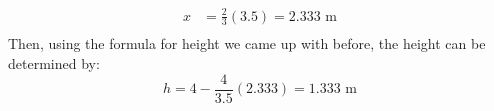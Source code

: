 \begin{enumerate}[1.]
\begin{multicols}{2}
\begin{Solution}
\[\begin{aligned}
      x & = \frac{2}{3}(3.5) = 2.333 \mbox{ m}\\
    \end{aligned}\]
Then, using the formula for height we came up with before, the height
can be determined by:
\[h = 4 - \frac{4}{3.5}(2.333) = 1.333\mbox{ m}\]
\par\end{Solution}
%


\end{multicols}

\end{enumerate}

